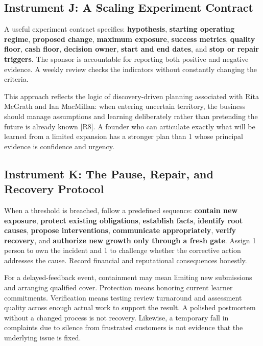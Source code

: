\subsection{Instrument J: A Scaling Experiment Contract}
\label{sec:instrument_j_experiment_contract}

A useful experiment contract specifies: \textbf{hypothesis}, \textbf{starting operating regime}, \textbf{proposed change}, \textbf{maximum exposure}, \textbf{success metrics}, \textbf{quality floor}, \textbf{cash floor}, \textbf{decision owner}, \textbf{start and end dates}, and \textbf{stop or repair triggers}. The sponsor is accountable for reporting both positive and negative evidence. A weekly review checks the indicators without constantly changing the criteria.

This approach reflects the logic of discovery-driven planning associated with Rita McGrath and Ian MacMillan: when entering uncertain territory, the business should manage assumptions and learning deliberately rather than pretending the future is already known [R8]. A founder who can articulate exactly what will be learned from a limited expansion has a stronger plan than 1 whose principal evidence is confidence and urgency.

\subsection{Instrument K: The Pause, Repair, and Recovery Protocol}
\label{sec:instrument_k_pause_repair_protocol}

When a threshold is breached, follow a predefined sequence: \textbf{contain new exposure}, \textbf{protect existing obligations}, \textbf{establish facts}, \textbf{identify root causes}, \textbf{propose interventions}, \textbf{communicate appropriately}, \textbf{verify recovery}, and \textbf{authorize new growth only through a fresh gate}. Assign 1 person to own the incident and 1 to challenge whether the corrective action addresses the cause. Record financial and reputational consequences honestly.

For a delayed-feedback event, containment may mean limiting new submissions and arranging qualified cover. Protection means honoring current learner commitments. Verification means testing review turnaround and assessment quality across enough actual work to support the result. A polished postmortem without a changed process is not recovery. Likewise, a temporary fall in complaints due to silence from frustrated customers is not evidence that the underlying issue is fixed.

